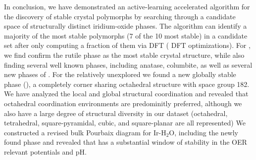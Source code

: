 


%
In conclusion, we have demonstrated an active-learning accelerated algorithm for the discovery of stable crystal polymorphs by searching through a candidate space of structurally distinct iridium-oxide phases.
%
The algorithm can identify a majority of the most stable polymorphs (7 of the 10 most stable) in a candidate set after only computing a fraction of them via DFT ( DFT optimizations).
%
For \IrOtwo, we find confirm the rutile phase as the most stable crystal structure, while also finding several well known phases, including anatase, columbite, as well as several new phases of \IrOtwo.
%
For the relatively unexplored \IrOthree we found a new globally stable phase (\aIrOthree), a completely corner sharing octahedral structure with space group 182.
%
%
We have analyzed the local and global structural coordination and revealed that octahedral coordination environments are predominitly preferred, although we also have a large degree of structural diversity in our dataset (octahedral, tetrahedral, square-pyramidal, cubic, and square-planar are all represented)
%
%
We constructed a revised bulk Pourbaix diagram for Ir-H$_2$O, including the newly found \aIrOthree phase and revealed that \aIrOthree has a substantial window of stability in the OER relevant potentials and pH.

